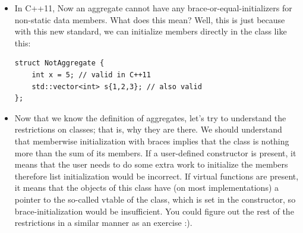 \documentclass[a4paper,11pt,twoside]{book}
\begin{document}
\begin{itemize}
	\item In C++11, Now an aggregate cannot have any brace-or-equal-initializers for non-static data members. What does this mean? Well, this is just because with this new standard, we can initialize members directly in the class like this:
\begin{lstlisting}[numbers=none]
struct NotAggregate {
	int x = 5; // valid in C++11
	std::vector<int> s{1,2,3}; // also valid
};
\end{lstlisting}

	\item Now that we know the definition of aggregates, let's try to understand the restrictions on classes; that is, why they are there. We should understand that memberwise initialization with braces implies that the class is nothing more than the sum of its members. If a user-defined constructor is present, it means that the user needs to do some extra work to initialize the members therefore list initialization would be incorrect. If virtual functions are present, it means that the objects of this class have (on most implementations) a pointer to the so-called vtable of the class, which is set in the constructor, so brace-initialization would be insufficient. You could figure out the rest of the restrictions in a similar manner as an exercise :).
	
\end{itemize}
\end{document}
